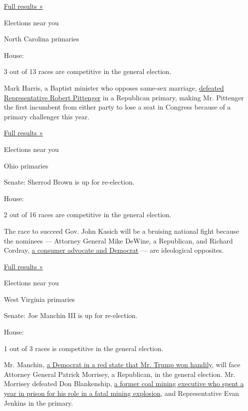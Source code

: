 \href{https://www.nytimes3xbfgragh.onion/interactive/2018/05/08/us/elections/results-indiana-primary-elections.html}{Full
results »}

Elections near you

North Carolina primaries

House:

3 out of 13 races are competitive in the general election.

Mark Harris, a Baptist minister who opposes same-sex marriage,
\href{https://www.nytimes3xbfgragh.onion/2018/05/09/us/politics/mark-harris-north-carolina-republican-pittenger.html}{defeated
Representative Robert Pittenger} in a Republican primary, making Mr.
Pittenger the first incumbent from either party to lose a seat in
Congress because of a primary challenger this year.

\href{https://www.nytimes3xbfgragh.onion/interactive/2018/05/08/us/elections/results-north-carolina-primary-elections.html}{Full
results »}

Elections near you

Ohio primaries

Senate: Sherrod Brown is up for re-election.

House:

2 out of 16 races are competitive in the general election.

The race to succeed Gov. John Kasich will be a bruising national fight
because the nominees --- Attorney General Mike DeWine, a Republican, and
Richard Cordray,
\href{https://www.nytimes3xbfgragh.onion/2018/04/29/us/politics/ohio-governor-richard-cordray-dennis-kucinich.html}{a
consumer advocate and Democrat} --- are ideological opposites.

\href{https://www.nytimes3xbfgragh.onion/interactive/2018/05/08/us/elections/results-ohio-primary-elections.html}{Full
results »}

Elections near you

West Virginia primaries

Senate: Joe Manchin III is up for re-election.

House:

1 out of 3 races is competitive in the general election.

Mr. Manchin,
\href{https://www.nytimes3xbfgragh.onion/2018/01/23/us/politics/manchin-reelection-this-place-sucks.html}{a
Democrat in a red state that Mr. Trump won handily}, will face Attorney
General Patrick Morrisey, a Republican, in the general election. Mr.
Morrisey defeated Don Blankenship,
\href{https://www.nytimes3xbfgragh.onion/2018/04/25/us/politics/don-blankenship-china-west-virginia.html}{a
former coal mining executive who spent a year in prison for his role in
a fatal mining explosion}, and Representative Evan Jenkins in the
primary.


